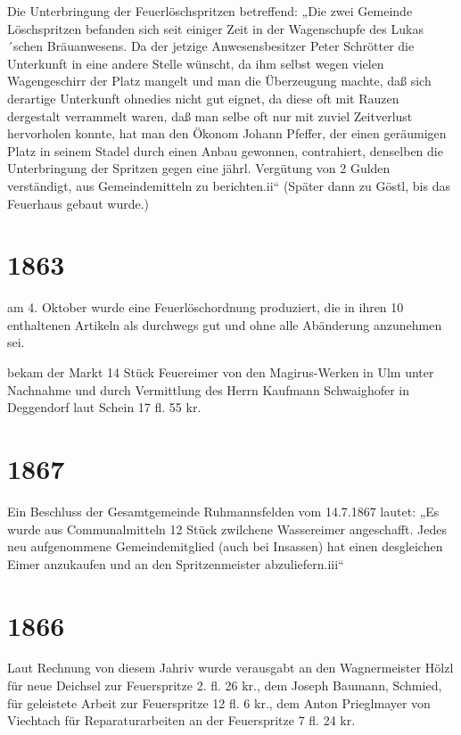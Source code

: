 \documentclass[12pt,a4paper]{book}
\begin{document}
Die Unterbringung der Feuerlöschspritzen betreffend: „Die zwei Gemeinde
Löschspritzen befanden sich seit einiger Zeit in der Wagenschupfe des
Lukas´schen Bräuanwesens. Da der jetzige Anwesensbesitzer Peter Schrötter die
Unterkunft in eine andere Stelle wünscht, da ihm selbst wegen vielen
Wagengeschirr der Platz mangelt und man die Überzeugung machte, daß sich
derartige Unterkunft ohnedies nicht gut eignet, da diese oft mit Rauzen
dergestalt verrammelt waren, daß man selbe oft nur mit zuviel Zeitverlust
hervorholen konnte, hat man den Ökonom Johann Pfeffer, der einen geräumigen
Platz in seinem Stadel durch einen Anbau gewonnen, contrahiert, denselben die
Unterbringung der Spritzen gegen eine jährl. Vergütung von 2 Gulden verständigt,
aus Gemeindemitteln zu berichten.ii“ (Später dann zu Göstl, bis das Feuerhaus
gebaut wurde.)

\section*{1863}

am 4. Oktober wurde eine Feuerlöschordnung produziert, die in ihren 10
enthaltenen Artikeln als durchwegs gut und ohne alle Abänderung anzunehmen sei.

bekam der Markt 14 Stück Feuereimer von den Magirus-Werken in Ulm unter
Nachnahme und durch Vermittlung des Herrn Kaufmann Schwaighofer in Deggendorf
laut Schein 17 fl. 55 kr.

\section*{1867}

Ein Beschluss der Gesamtgemeinde Ruhmannsfelden vom 14.7.1867 lautet:
„Es wurde aus Communalmitteln 12 Stück zwilchene Wassereimer angeschafft. Jedes
neu aufgenommene Gemeindemitglied (auch bei Insassen) hat einen desgleichen
Eimer anzukaufen und an den Spritzenmeister abzuliefern.iii“

\section*{1866}

Laut Rechnung von diesem Jahriv wurde verausgabt an den Wagnermeister Hölzl für
neue Deichsel zur Feuerspritze 2. fl. 26 kr., dem Joseph Baumann, Schmied, für
geleistete Arbeit zur Feuerspritze 12 fl. 6 kr., dem Anton Prieglmayer von
Viechtach für Reparaturarbeiten an der Feuerspritze 7 fl. 24 kr.
\end{document}
